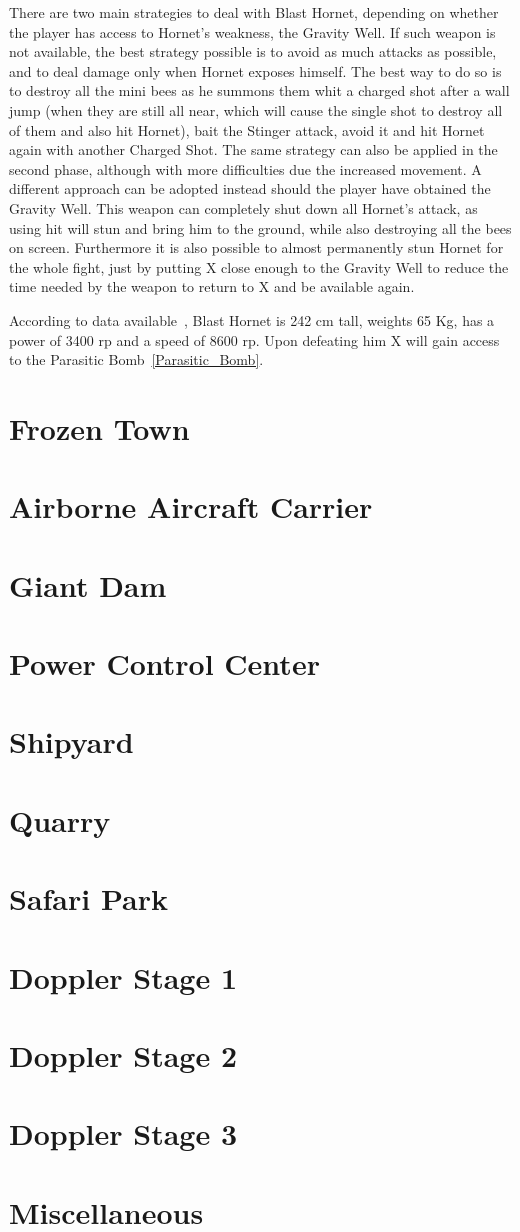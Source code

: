 There are two main strategies to deal with Blast Hornet, depending on whether the player has access to Hornet's weakness, the Gravity Well. If such weapon is not available, the best strategy possible is to avoid as much attacks as possible, and to deal damage only when Hornet exposes himself. The best way to do so is to destroy all the mini bees as he summons them whit a charged shot after a wall jump (when they are still all near, which will cause the single shot to destroy all of them and also hit Hornet), bait the Stinger attack, avoid it and hit Hornet again with another Charged Shot. The same strategy can also be applied in the second phase, although with more difficulties due the increased movement. A different approach can be adopted instead should the player have obtained the Gravity Well. This weapon can completely shut down all Hornet's attack, as using hit will stun and bring him to the ground, while also destroying all the bees on screen. Furthermore it is also possible to almost permanently stun Hornet for the whole fight, just by putting X close enough to the Gravity Well to reduce the time needed by the weapon to return to X and be available again.

According to data available~\cite{wayback:X3_resources}, Blast Hornet is 242 cm tall, weights 65 Kg, has a power of 3400 rp and a speed of 8600 rp. Upon defeating him X will gain access to the Parasitic Bomb~\ref{Parasitic_Bomb}.

\section{Frozen Town}
\section{Airborne Aircraft Carrier}
\section{Giant Dam}
\section{Power Control Center}
\section{Shipyard}
\section{Quarry}
\section{Safari Park}

\section{Doppler Stage 1}
\section{Doppler Stage 2}
\section{Doppler Stage 3}

\section{Miscellaneous}\label{X3:misc} %
